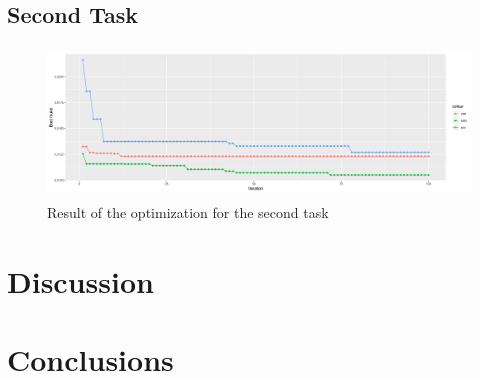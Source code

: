 \subsection{Second Task}

\begin{figure}[!h]
    \centering
    \includegraphics[width=\linewidth, height=4cm]{imgs/comparison_MSE_second.png}
    \caption{Result of the optimization for the second task}
    \label{fig:second_task}
\end{figure}  

\section{Discussion}


\section{Conclusions}

